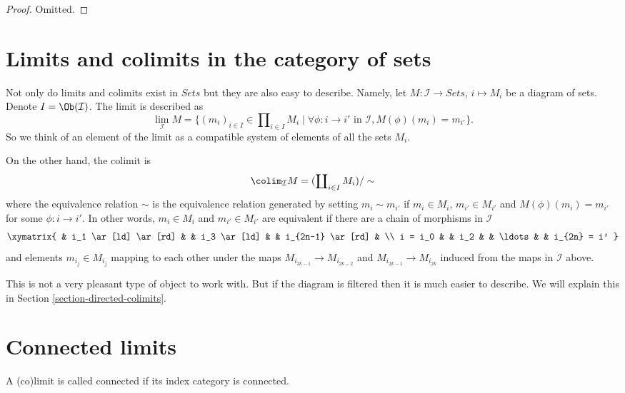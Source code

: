 \begin{proof}
Omitted.
\end{proof}







\section{Limits and colimits in the category of sets}
\label{section-limit-sets}

\noindent
Not only do limits and colimits exist in $\textit{Sets}$
but they are also easy to describe. Namely, let $M : \mathcal{I}
\to \textit{Sets}$, $i \mapsto M_i$ be a diagram of sets.
Denote $I = \Ob(\mathcal{I})$.
The limit is described as
$$
\lim_\mathcal{I} M
=
\{
(m_i)_{i\in I} \in \prod\nolimits_{i\in I} M_i
\mid
\forall \phi : i \to i' \text{ in }\mathcal{I},
M(\phi)(m_i) = m_{i'}
\}.
$$
So we think of an element of the limit as a compatible system of elements
of all the sets $M_i$.

\medskip\noindent
On the other hand, the colimit is
$$
\colim_\mathcal{I} M
=
(\coprod\nolimits_{i\in I} M_i)/\sim
$$
where the equivalence relation $\sim$ is the equivalence relation
generated by setting $m_i \sim m_{i'}$ if $m_i \in M_i$,
$m_{i'} \in M_{i'}$ and $M(\phi)(m_i) = m_{i'}$ for some
$\phi : i \to i'$. In other words, $m_i \in M_i$
and $m_{i'} \in M_{i'}$ are equivalent if there are a
chain of morphisms in $\mathcal{I}$
$$
\xymatrix{
&
i_1 \ar[ld] \ar[rd] & &
i_3 \ar[ld] & &
i_{2n-1} \ar[rd] & \\
i = i_0 & &
i_2 & &
\ldots & &
i_{2n} = i'
}
$$
and elements $m_{i_j} \in M_{i_j}$ mapping to each other under
the maps $M_{i_{2k-1}} \to M_{i_{2k-2}}$ and $M_{i_{2k-1}}
\to M_{i_{2k}}$ induced from the maps in $\mathcal{I}$ above.

\medskip\noindent
This is not a very pleasant type of object to work with.
But if the diagram is filtered then it is much easier to
describe. We will explain this in Section \ref{section-directed-colimits}.



\section{Connected limits}
\label{section-connected-limits}

\noindent
A (co)limit is called connected if its index category is connected.

